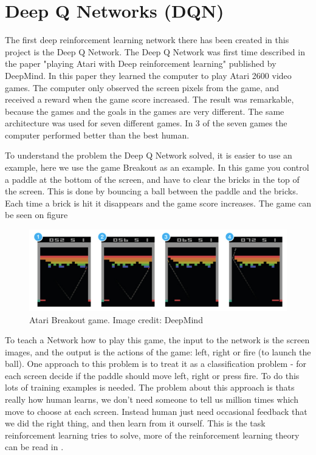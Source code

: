 \section{Deep Q Networks (DQN)}
\label{sec:DQN}
The first deep reinforcement learning network there has been created in this project is the Deep Q Network. The Deep Q Network was first time described in the paper "playing Atari with Deep reinforcement learning" \cite{DBLP:journals/corr/MnihKSGAWR13} published by DeepMind. In this paper they learned the computer to play Atari 2600 video games. The computer only observed the screen pixels from the game, and received a reward when the game score increased. The result was remarkable, because the games and the goals in the games are very different. The same architecture was used for seven different games. In 3 of the seven games the computer performed better than the best human. 

To understand the problem the Deep Q Network solved, it is easier to use an example, here we use the game Breakout as an example. In this game you control a paddle at the bottom of the screen, and have to clear the bricks in the top of the screen. This is done by bouncing a ball between the paddle and the bricks. Each time a brick is hit it disappears and the game score increases. The game can be seen on figure 

\begin{figure}[H]
	\centering
	\includegraphics[width=1\textwidth]{Figures/Architecture/DQN/Atari_breakout.png}
	\caption{Atari Breakout game. Image credit: DeepMind\cite{DBLP:journals/corr/MnihKSGAWR13} }
	\label{fig:Atari_breakout}
\end{figure}

To teach a Network how to play this game, the input to the network is the screen images, and the output is the actions of the game: left, right or fire (to launch the ball). One approach to this problem is to treat it as a classification problem - for each screen decide if the paddle should move left, right or press fire. To do this lots of training examples is needed. The problem about this approach is thats really how human learns, we don't need someone to tell us million times which move to choose at each screen. Instead human just need occasional feedback that we did the right thing, and then learn from it ourself. This is the task reinforcement learning tries to solve, more of the reinforcement learning theory can be read in .

